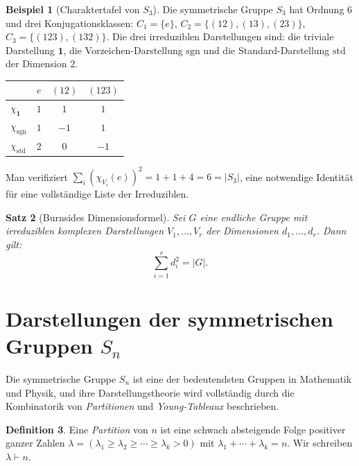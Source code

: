 \documentclass[12pt,a4paper]{amsart}
\newtheorem{theorem}{Satz}[section]
\theoremstyle{definition}
\newtheorem{definition}[theorem]{Definition}
\newtheorem{beispiel}[theorem]{Beispiel}
\begin{document}
\begin{beispiel}[Charaktertafel von $S_3$]
Die symmetrische Gruppe $S_3$ hat Ordnung $6$ und drei Konjugationsklassen:
$C_1 = \{e\}$, $C_2 = \{(12),(13),(23)\}$, $C_3 = \{(123),(132)\}$.
Die drei irreduziblen Darstellungen sind: die triviale Darstellung $\mathbf{1}$,
die Vorzeichen-Darstellung $\mathrm{sgn}$ und die Standard-Darstellung
$\mathrm{std}$ der Dimension $2$.

\begin{center}
\begin{tabular}{lccc}
\toprule
 & $e$ & $(12)$ & $(123)$ \\
\midrule
$\chi_{\mathbf{1}}$ & $1$ & $1$ & $1$ \\
$\chi_{\mathrm{sgn}}$ & $1$ & $-1$ & $1$ \\
$\chi_{\mathrm{std}}$ & $2$ & $0$ & $-1$ \\
\bottomrule
\end{tabular}
\end{center}

Man verifiziert $\sum_i (\chi_{V_i}(e))^2 = 1 + 1 + 4 = 6 = |S_3|$, eine
notwendige Identität für eine vollständige Liste der Irreduziblen.
\end{beispiel}

\begin{theorem}[Burnsides Dimensionsformel]
\label{satz:burnside_dim}
Sei $G$ eine endliche Gruppe mit irreduziblen komplexen Darstellungen
$V_1,\ldots,V_r$ der Dimensionen $d_1,\ldots,d_r$.  Dann gilt:
\[
    \sum_{i=1}^{r} d_i^2 = |G|.
\]
\end{theorem}

\section{Darstellungen der symmetrischen Gruppen $S_n$}
\label{sec:sn}

Die symmetrische Gruppe $S_n$ ist eine der bedeutendsten Gruppen in Mathematik
und Physik, und ihre Darstellungstheorie wird vollständig durch die Kombinatorik
von \emph{Partitionen} und \emph{Young-Tableaux} beschrieben.

\begin{definition}
Eine \emph{Partition} von $n$ ist eine schwach absteigende Folge positiver
ganzer Zahlen $\lambda = (\lambda_1 \geq \lambda_2 \geq \cdots \geq \lambda_k > 0)$
mit $\lambda_1 + \cdots + \lambda_k = n$.  Wir schreiben $\lambda \vdash n$.
\end{definition}
\end{document}
